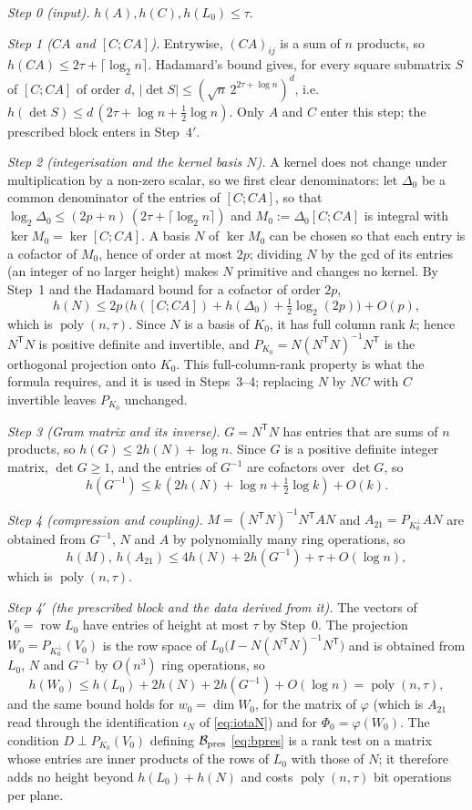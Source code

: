 \documentclass[journal]{IEEEtran}
\theoremstyle{plainn}
\theoremstyle{remark}
\newcommand{\row}{\operatorname{row}}
\newcommand{\poly}{\operatorname{poly}}
\begin{document}
\emph{Step 0 (input).} $h(A),h(C),h(L_0)\le\tau$.

\emph{Step 1 ($CA$ and $[C;CA]$).} Entrywise, $(CA)_{ij}$ is a sum of $n$ products, so
$h(CA)\le 2\tau+\lceil\log_2 n\rceil$. Hadamard's bound gives, for every square submatrix $S$ of
$[C;CA]$ of order $d$, $|\det S|\le(\sqrt{n}\,2^{2\tau+\log n})^{d}$, i.e.\
$h(\det S)\le d\,(2\tau+\log n+\tfrac12\log n)$. Only $A$ and $C$ enter this step; the prescribed block
enters in Step~$4'$.

\emph{Step 2 (integerisation and the kernel basis $N$).} A kernel does not change under multiplication by a
non-zero scalar, so we first clear denominators: let $\Delta_0$ be a common denominator of the entries of
$[C;CA]$, so that $\log_2\Delta_0\le(2p+n)\,(2\tau+\lceil\log_2 n\rceil)$ and
$M_0:=\Delta_0[C;CA]$ is integral with $\ker M_0=\ker[C;CA]$. A basis $N$ of $\ker M_0$ can be chosen so
that each entry is a cofactor of $M_0$, hence of order at most $2p$; dividing $N$ by the gcd of its entries
(an integer of no larger height) makes $N$ primitive and changes no kernel. By Step~1 and the Hadamard
bound for a cofactor of order $2p$,
\[
h(N)\le 2p\,\bigl(h([C;CA])+h(\Delta_0)+\tfrac12\log_2(2p)\bigr)+O(p),
\]
which is $\poly(n,\tau)$. Since $N$ is a basis of $K_0$, it has full column rank $k$; hence
$N^{\mathsf T}N$ is positive definite and invertible, and $P_{K_0}=N(N^{\mathsf T}N)^{-1}N^{\mathsf T}$ is
the orthogonal projection onto $K_0$. This full-column-rank property is what the formula requires, and it
is used in Steps~3--4; replacing $N$ by $NC$ with $C$ invertible leaves $P_{K_0}$ unchanged.

\emph{Step 3 (Gram matrix and its inverse).} $G=N^{\mathsf T}N$ has entries that are sums of $n$
products, so $h(G)\le 2h(N)+\log n$. Since $G$ is a positive definite integer matrix, $\det G\ge1$,
and the entries of $G^{-1}$ are cofactors over $\det G$, so
\[
h(G^{-1})\le k\,(2h(N)+\log n+\tfrac12\log k)+O(k).
\]

\emph{Step 4 (compression and coupling).} $M=(N^{\mathsf T}N)^{-1}N^{\mathsf T}AN$ and
$A_{21}=P_{K_0^\perp}AN$ are obtained from $G^{-1}$, $N$ and $A$ by polynomially many ring
operations, so
\[
h(M),\,h(A_{21})\le 4h(N)+2h(G^{-1})+\tau+O(\log n),
\]
which is $\poly(n,\tau)$.

\emph{Step 4$'$ (the prescribed block and the data derived from it).} The vectors of $V_0=\row L_0$ have
entries of height at most $\tau$ by Step~0. The projection
$W_0=P_{K_0^\perp}(V_0)$ is the row space of $L_0\bigl(I-N(N^{\mathsf T}N)^{-1}N^{\mathsf T}\bigr)$ and is obtained from $L_0$, $N$
and $G^{-1}$ by $O(n^3)$ ring operations, so
\[
h(W_0)\le h(L_0)+2h(N)+2h(G^{-1})+O(\log n)=\poly(n,\tau),
\]
and the same bound holds for $w_0=\dim W_0$, for the matrix of $\varphi$ (which is $A_{21}$ read through
the identification $\iota_N$ of \eqref{eq:iotaN}) and for $\Phi_0=\varphi(W_0)$. The condition
$D\perp P_{K_0}(V_0)$ defining $\mathcal B_{\rm pres}$ \eqref{eq:bpres} is a rank test on a matrix whose
entries are inner products of the rows of $L_0$ with those of $N$; it therefore adds no height beyond
$h(L_0)+h(N)$ and costs $\poly(n,\tau)$ bit operations per plane.
\end{document}
